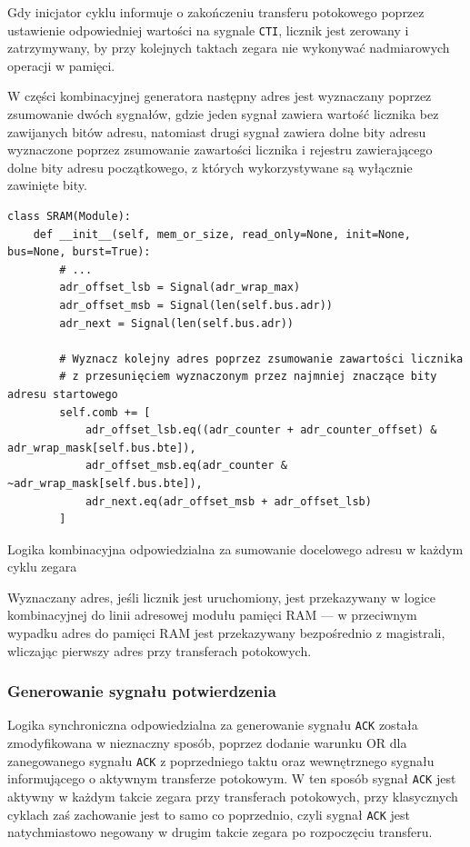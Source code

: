 Gdy inicjator cyklu informuje o zakończeniu transferu potokowego poprzez ustawienie odpowiedniej wartości na sygnale \texttt{CTI}, licznik jest zerowany i zatrzymywany, by przy kolejnych taktach zegara nie wykonywać nadmiarowych operacji w pamięci.

W części kombinacyjnej generatora następny adres jest wyznaczany poprzez zsumowanie dwóch sygnałów, gdzie jeden sygnał zawiera wartość licznika bez zawijanych bitów adresu, natomiast drugi sygnał zawiera dolne bity adresu wyznaczone poprzez zsumowanie zawartości licznika i rejestru zawierającego dolne bity adresu początkowego, z których wykorzystywane są wyłącznie zawinięte bity.

\begin{longlisting}
\begin{verbatim}
class SRAM(Module):
    def __init__(self, mem_or_size, read_only=None, init=None, bus=None, burst=True):
        # ...
        adr_offset_lsb = Signal(adr_wrap_max)
        adr_offset_msb = Signal(len(self.bus.adr))
        adr_next = Signal(len(self.bus.adr))

        # Wyznacz kolejny adres poprzez zsumowanie zawartości licznika
        # z przesunięciem wyznaczonym przez najmniej znaczące bity adresu startowego
        self.comb += [
            adr_offset_lsb.eq((adr_counter + adr_counter_offset) & adr_wrap_mask[self.bus.bte]),
            adr_offset_msb.eq(adr_counter & ~adr_wrap_mask[self.bus.bte]),
            adr_next.eq(adr_offset_msb + adr_offset_lsb)
        ]
\end{verbatim}
\caption{Logika kombinacyjna odpowiedzialna za sumowanie docelowego adresu w każdym cyklu zegara}
\label{lst:impl-sram-adrnext}
\end{longlisting}

Wyznaczany adres, jeśli licznik jest uruchomiony, jest przekazywany w logice kombinacyjnej do linii adresowej modułu pamięci RAM --- w przeciwnym wypadku adres do pamięci RAM jest przekazywany bezpośrednio z magistrali, wliczając pierwszy adres przy transferach potokowych.

\subsubsection{Generowanie sygnału potwierdzenia}

Logika synchroniczna odpowiedzialna za generowanie sygnału \texttt{ACK} została zmodyfikowana w nieznaczny sposób, poprzez dodanie warunku OR dla zanegowanego sygnału \texttt{ACK} z poprzedniego taktu oraz wewnętrznego sygnału informującego o aktywnym transferze potokowym. W ten sposób sygnał \texttt{ACK} jest aktywny w każdym takcie zegara przy transferach potokowych, przy klasycznych cyklach zaś zachowanie jest to samo co poprzednio, czyli sygnał \texttt{ACK} jest natychmiastowo negowany w drugim takcie zegara po rozpoczęciu transferu.

